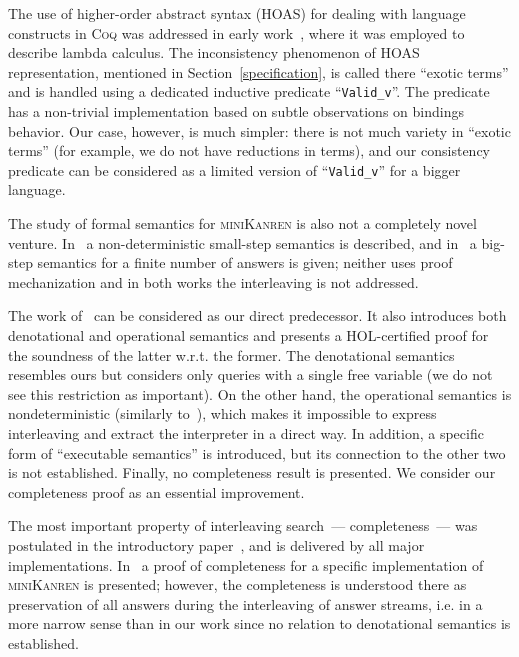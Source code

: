 The use of higher-order abstract syntax (HOAS) for dealing with language constructs in \textsc{Coq} was addressed in early work~\cite{HOASinCoq},
where it was employed to describe lambda calculus. The inconsistency phenomenon of HOAS representation, mentioned in Section~\ref{specification}, is called
there ``exotic terms'' and is handled using a dedicated inductive predicate ``\lstinline|Valid_v|''. The predicate has a non-trivial implementation based
on subtle observations on bindings behavior. Our case, however, is much simpler: there is not much variety in ``exotic terms'' (for example, we do not have
reductions in terms), and our consistency predicate can be considered as a limited version of ``\lstinline|Valid_v|'' for a bigger language.

The study of formal semantics for \textsc{miniKanren} is also not a completely novel venture. In~\cite{RelConversion} a non-deterministic
small-step semantics is described, and in~\cite{DivTest} a big-step semantics for a finite number of answers is given;
neither uses proof mechanization and in both works the interleaving is not addressed. 

The work of~\cite{MechanisingMiniKanren} can be considered as our direct predecessor. It also introduces both denotational and
operational semantics and presents a \textsc{HOL}-certified proof for the soundness of the latter w.r.t. the former. The denotational
semantics resembles ours but considers only queries with a single free variable (we do not see this restriction as important).
On the other hand, the operational semantics is nondeterministic (similarly to~\cite{RelConversion}), which makes it
impossible to express interleaving and extract the interpreter in a direct way. In addition, a specific form of ``executable semantics''
is introduced, but its connection to the other two is not established. Finally, no completeness result is presented.
We consider our completeness proof as an essential improvement. 

The most important property of interleaving search~--- completeness~--- was postulated in the introductory paper~\cite{Search}, and is delivered by
all major implementations. In~\cite{2016} a proof of completeness for a specific implementation of \textsc{miniKanren} is presented; however, the completeness is understood there as
preservation of all answers during the interleaving of answer streams, i.e. in a more narrow sense than in our work since no relation
to denotational semantics is established.
